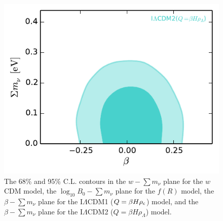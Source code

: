 \documentclass[aps,prd,nofootinbib,amsmath,amssymb,twocolumn,superscriptaddress,10pt]{revtex4}%
\begin{document}
\begin{figure}
\begin{center}
\includegraphics[scale=0.6, angle=0]{idebeta2-mnu.pdf}
\caption{The 68\% and 95\% C.L. contours in the $w-\sum m_{\nu}$ plane for the $w$CDM model, the $\log_{10}B_{0}-\sum m_{\nu}$ plane for the $f(R)$ model, the $\beta-\sum m_{\nu}$ plane for the I$\Lambda$CDM1 ($Q=\beta H \rho_{\rm c}$) model, and the $\beta-\sum m_{\nu}$ plane for the I$\Lambda$CDM2 ($Q=\beta H\rho_{\Lambda}$) model.}
\label{fig:all-mnu}
\end{center}
\end{figure}
\end{document}
